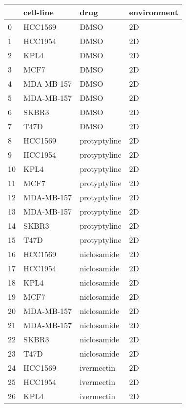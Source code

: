 \begin{tabular}{llll}
\toprule
{} &   cell-line &          drug & environment \\
\midrule
0  &     HCC1569 &          DMSO &          2D \\
1  &     HCC1954 &          DMSO &          2D \\
2  &        KPL4 &          DMSO &          2D \\
3  &        MCF7 &          DMSO &          2D \\
4  &  MDA-MB-157 &          DMSO &          2D \\
5  &  MDA-MB-157 &          DMSO &          2D \\
6  &       SKBR3 &          DMSO &          2D \\
7  &        T47D &          DMSO &          2D \\
8  &     HCC1569 &  protyptyline &          2D \\
9  &     HCC1954 &  protyptyline &          2D \\
10 &        KPL4 &  protyptyline &          2D \\
11 &        MCF7 &  protyptyline &          2D \\
12 &  MDA-MB-157 &  protyptyline &          2D \\
13 &  MDA-MB-157 &  protyptyline &          2D \\
14 &       SKBR3 &  protyptyline &          2D \\
15 &        T47D &  protyptyline &          2D \\
16 &     HCC1569 &   niclosamide &          2D \\
17 &     HCC1954 &   niclosamide &          2D \\
18 &        KPL4 &   niclosamide &          2D \\
19 &        MCF7 &   niclosamide &          2D \\
20 &  MDA-MB-157 &   niclosamide &          2D \\
21 &  MDA-MB-157 &   niclosamide &          2D \\
22 &       SKBR3 &   niclosamide &          2D \\
23 &        T47D &   niclosamide &          2D \\
24 &     HCC1569 &    ivermectin &          2D \\
25 &     HCC1954 &    ivermectin &          2D \\
26 &        KPL4 &    ivermectin &          2D \\

\end{tabular}
